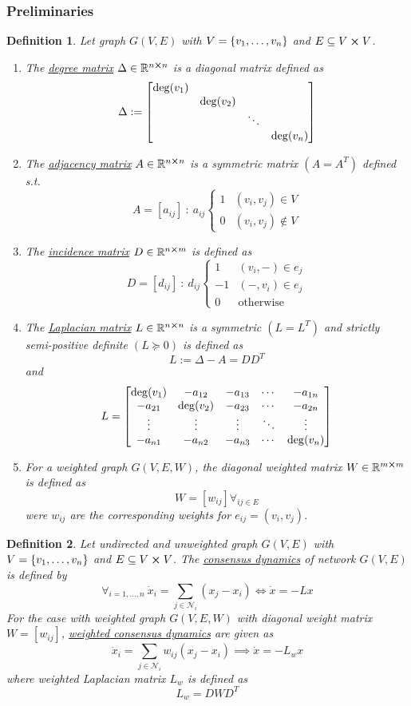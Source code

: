 \documentclass[]{article}
\numberwithin{equation}{section}
\newcommand{\R}{\mathbb{R}}
\newcommand{\st}{\ : \ }
\newtheorem{definition}{Definition}
\begin{document}
\subsubsection*{Preliminaries}
\begin{definition} \label{def:graph_matrices}
	Let graph $G(V,E)$ with $V = \qty{v_1,\dots,v_n}$ and $E \subseteq V \cross V$.
	\begin{enumerate}
		\item The \underline{\emph{degree matrix}} $\Delta \in \R^{n\cross n}$ is a diagonal matrix defined as \[
			\Delta := \mqty[\dmat{\deg(v_1), \deg(v_2), \ddots, \deg(v_n)}]
		\]
		\item The \emph{\underline{adjacency matrix}} $A \in \R^{n\cross n}$ is a symmetric matrix $(A = A^T)$ defined s.t. \[
			A = [a_{ij}] \st a_{ij} \begin{cases}
				1 &(v_i,v_j) \in V\\
				0 &(v_i,v_j) \notin V
			\end{cases}
		\]
		\item The \emph{\underline{incidence matrix}} $D \in \R^{n \cross m}$ is defined as\[
			D = [d_{ij}] \st d_{ij} \begin{cases}
				1 	&(v_i,-) \in e_{j}\\
				-1	&(-,v_i) \in e_{j}\\
				0	&\text{otherwise}
			\end{cases}
		\]
		\item The \emph{\underline{Laplacian matrix}} $L \in \R^{n \cross n}$ is a symmetric $(L = L^T)$ and strictly semi-positive definite $(L \succeq 0)$ is defined as\[
			L := \Delta - A = D D^T
		\]and\[
			L = \mqty[
				\deg(v_1)	&-a_{12}	&-a_{13}	&\cdots	&-a_{1n}\\
				-a_{21}		&\deg(v_2)	&-a_{23}	&\cdots	&-a_{2n}\\
				\vdots		&\vdots		&\vdots		&\ddots	&\vdots\\
				-a_{n1}		&-a_{n2}	&-a_{n3}	&\cdots	&\deg(v_n)
			]
		\]
		\item For a weighted graph $G(V,E,W)$, the diagonal weighted matrix $W\in \R^{m\cross m}$ is defined as\[
			W = [w_{ij}] \forall_{ij \in E}
		\]
		were $w_{ij}$ are the corresponding weights for $e_{ij} = (v_i,v_j)$.
	\end{enumerate}
\end{definition}

\begin{definition} \label{def:consensus_dynamics}
	Let undirected and unweighted graph $G(V,E)$ with $V = \qty{v_1,\dots,v_n}$ and $E \subseteq V \cross V$.
	The \emph{\underline{consensus dynamics}} of network $G(V,E)$ is defined by\[
		\forall_{i=1,\dots,n} \ \dot{x}_i = \sum_{j\in \mathcal{N}_i} (x_j - x_i)
		\iff \dot{x} = -L x
	\] For the case with weighted graph $G(V,E,W)$ with diagonal weight matrix $W = [w_{ij}]$, 
	\emph{\underline{weighted consensus dynamics}} are given as\[
		\dot{x}_i = \sum_{j\in\mathcal{N}_i} w_{ij} (x_j - x_i) 
		\implies \dot{x} = - L_{w} x
	\]where weighted Laplacian matrix $L_{w}$ is defined as\[
		L_{w} = D W D^T
	\]
\end{definition}
\end{document}
